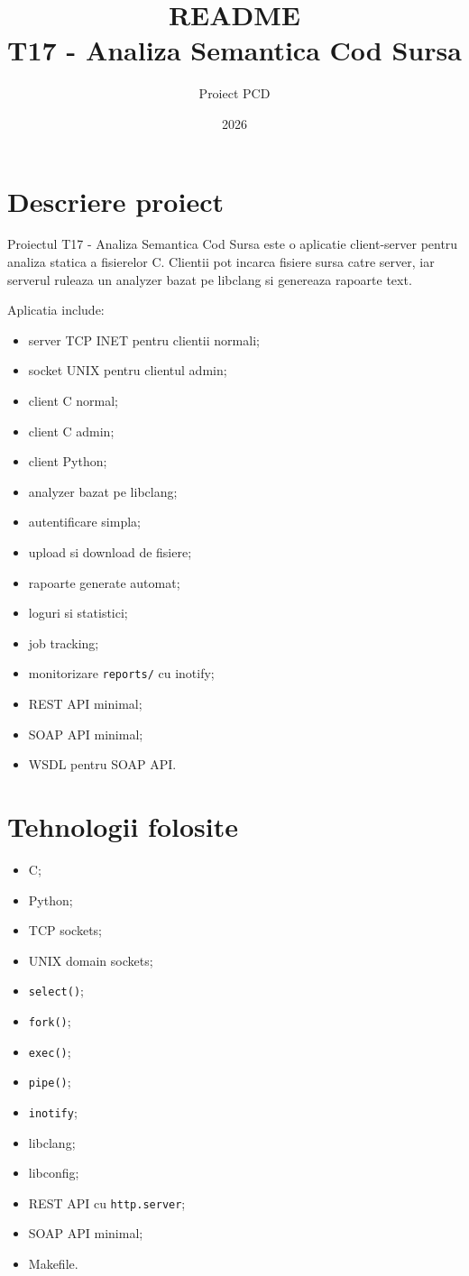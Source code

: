\documentclass[12pt,a4paper]{article}
\title{README \\ T17 - Analiza Semantica Cod Sursa}
\author{Proiect PCD}
\date{2026}
\begin{document}
\maketitle
\tableofcontents
\newpage

\section{Descriere proiect}

Proiectul T17 - Analiza Semantica Cod Sursa este o aplicatie client-server pentru analiza statica a fisierelor C. Clientii pot incarca fisiere sursa catre server, iar serverul ruleaza un analyzer bazat pe libclang si genereaza rapoarte text.

Aplicatia include:

\begin{itemize}
    \item server TCP INET pentru clientii normali;
    \item socket UNIX pentru clientul admin;
    \item client C normal;
    \item client C admin;
    \item client Python;
    \item analyzer bazat pe libclang;
    \item autentificare simpla;
    \item upload si download de fisiere;
    \item rapoarte generate automat;
    \item loguri si statistici;
    \item job tracking;
    \item monitorizare \texttt{reports/} cu inotify;
    \item REST API minimal;
    \item SOAP API minimal;
    \item WSDL pentru SOAP API.
\end{itemize}

\section{Tehnologii folosite}

\begin{itemize}
    \item C;
    \item Python;
    \item TCP sockets;
    \item UNIX domain sockets;
    \item \texttt{select()};
    \item \texttt{fork()};
    \item \texttt{exec()};
    \item \texttt{pipe()};
    \item \texttt{inotify};
    \item libclang;
    \item libconfig;
    \item REST API cu \texttt{http.server};
    \item SOAP API minimal;
    \item Makefile.
\end{itemize}
\end{document}
